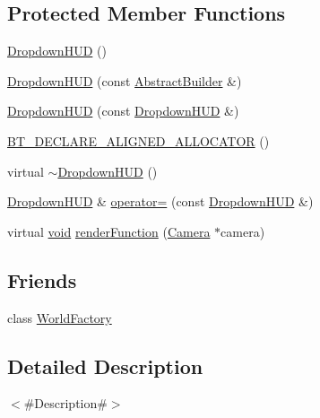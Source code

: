 \subsection*{Protected Member Functions}
\begin{DoxyCompactItemize}
\item 
\mbox{\hyperlink{classnjli_1_1_dropdown_h_u_d_a17dd6c8ecb94471289bcb69662582207}{Dropdown\+H\+UD}} ()
\item 
\mbox{\hyperlink{classnjli_1_1_dropdown_h_u_d_a6f5b1a8e46033f2871b1d3c80294d312}{Dropdown\+H\+UD}} (const \mbox{\hyperlink{classnjli_1_1_abstract_builder}{Abstract\+Builder}} \&)
\item 
\mbox{\hyperlink{classnjli_1_1_dropdown_h_u_d_a0c890dbe0093b1920ddfd628cf7b7ad0}{Dropdown\+H\+UD}} (const \mbox{\hyperlink{classnjli_1_1_dropdown_h_u_d}{Dropdown\+H\+UD}} \&)
\item 
\mbox{\hyperlink{classnjli_1_1_dropdown_h_u_d_a8cd9837739df28e99c13778009565422}{B\+T\+\_\+\+D\+E\+C\+L\+A\+R\+E\+\_\+\+A\+L\+I\+G\+N\+E\+D\+\_\+\+A\+L\+L\+O\+C\+A\+T\+OR}} ()
\item 
virtual \mbox{\hyperlink{classnjli_1_1_dropdown_h_u_d_af572f6f51c3973a6a5c7ae4c653275b4}{$\sim$\+Dropdown\+H\+UD}} ()
\item 
\mbox{\hyperlink{classnjli_1_1_dropdown_h_u_d}{Dropdown\+H\+UD}} \& \mbox{\hyperlink{classnjli_1_1_dropdown_h_u_d_acbfbdf4a4fcacb1d26d2c750fe7386e7}{operator=}} (const \mbox{\hyperlink{classnjli_1_1_dropdown_h_u_d}{Dropdown\+H\+UD}} \&)
\item 
virtual \mbox{\hyperlink{_thread_8h_af1e856da2e658414cb2456cb6f7ebc66}{void}} \mbox{\hyperlink{classnjli_1_1_dropdown_h_u_d_a69bfd903a2b1d0881f9269679621e050}{render\+Function}} (\mbox{\hyperlink{classnjli_1_1_camera}{Camera}} $\ast$camera)
\end{DoxyCompactItemize}
\subsection*{Friends}
\begin{DoxyCompactItemize}
\item 
class \mbox{\hyperlink{classnjli_1_1_dropdown_h_u_d_acb96ebb09abe8f2a37a915a842babfac}{World\+Factory}}
\end{DoxyCompactItemize}


\subsection{Detailed Description}
$<$\#\+Description\#$>$ 

